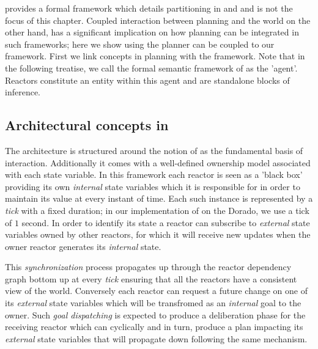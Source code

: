 \rx provides a formal framework which details partitioning in
\cite{py10} and \cite{rajan12} and is not the focus of this
chapter. Coupled interaction between planning and the world on the
other hand, has a significant implication on how planning can be
integrated in such frameworks; here we show using the \eu planner can
be coupled to our framework. First we link concepts in \eu planning
with the \rx framework. Note that in the following treatise, we call
the formal semantic framework of \rx as the 'agent'. Reactors
constitute an entity within this agent and are standalone blocks of
inference.


\subsection{Architectural concepts in \rx}
\label{sec:arch:trex}

The \rx architecture is structured around the notion of  as the fundamental basis of interaction. Additionally it
comes with a well-defined ownership model associated with each state
variable. In this framework each reactor is seen as a 'black box'
providing its own {\em internal} state variables which it is
responsible for in order to maintain its value at every instant of
time. Each such instance is represented by a {\em tick} with a fixed
duration; in our implementation of \rx on the Dorado, we use a tick of
$1$ second. In order to identify its state a reactor can subscribe to
{\em external} state variables owned by other reactors, for which it
will receive new updates when the owner reactor generates its {\em
  internal} state.

This {\em synchronization} process propagates up through the reactor
dependency graph bottom up at every {\em tick} ensuring that all the
reactors have a consistent view of the world. Conversely each reactor
can request a future change on one of its {\em external} state
variables which will be transfromed as an {\em internal} goal to the
owner. Such \emph{goal dispatching} is expected to produce a
deliberation phase for the receiving reactor which can cyclically and
in turn, produce a plan impacting its {\em external} state variables
that will propagate down following the same mechanism.

